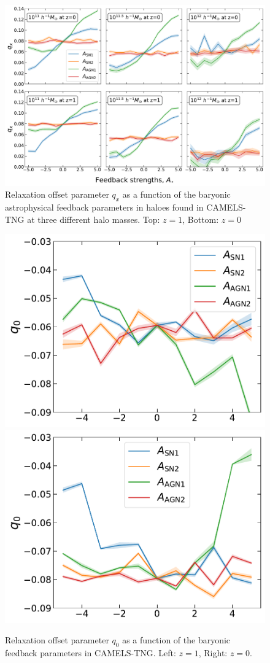 \begin{figure}[htbp]
\centering
\includegraphics[width=\linewidth]{plots/CAMELS_I_qx0.pdf}
\caption{Relaxation offset parameter $q_x$  as a function of the baryonic astrophysical feedback parameters in haloes found in CAMELS-TNG at three different halo masses. Top: $z=1$, Bottom: $z=0$}
\label{fig:camels-qx0}
\end{figure}

\begin{figure}[htbp]
\centering
\includegraphics[width=0.49\linewidth]{plots/CAMELS_I_q0_sn18.pdf}
\includegraphics[width=0.49\linewidth]{plots/CAMELS_I_q0_sn33.pdf}
\caption{Relaxation offset parameter $q_0$ as a function of the baryonic feedback parameters in CAMELS-TNG. Left: $z=1$, Right: $z=0$.}
\label{fig:camels-q0q1}
\end{figure}

